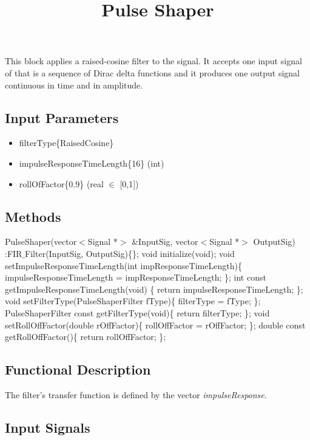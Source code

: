 \documentclass[a4paper]{article}
\title{Pulse Shaper}
\begin{document}
\maketitle

This block applies a raised-cosine filter to the signal. It accepts one input signal of that is a sequence of Dirac delta functions and it produces one output signal continuous in time and in amplitude.

\subsection*{Input Parameters}

\begin{itemize}
	\item filterType\{RaisedCosine\} \linebreak
	\item impulseResponseTimeLength\{16\} \linebreak (int)
	\item rollOfFactor\{0.9\} \linebreak
	(real $\in$ [0,1])
\end{itemize}

\subsection*{Methods}

PulseShaper(vector$<$Signal *$>$ \&InputSig, vector$<$Signal *$>$ OutputSig) :FIR$\_$Filter(InputSig, OutputSig)\{\};
\bigbreak	
void initialize(void);
\bigbreak	
void setImpulseResponseTimeLength(int impResponseTimeLength)\{ impulseResponseTimeLength = impResponseTimeLength; \};
\bigbreak
int const getImpulseResponseTimeLength(void) \{ return impulseResponseTimeLength; \};
\bigbreak	
void setFilterType(PulseShaperFilter fType)\{ filterType = fType; \};
\bigbreak
PulseShaperFilter const getFilterType(void)\{ return filterType; \};
\bigbreak	
void setRollOffFactor(double rOffFactor)\{ rollOffFactor = rOffFactor; \};
\bigbreak
double const getRollOffFactor()\{ return rollOffFactor; \};

\subsection*{Functional Description}

The filter's transfer function is defined by the vector \textit{impulseResponse}. 

\subsection*{Input Signals}
\end{document}
